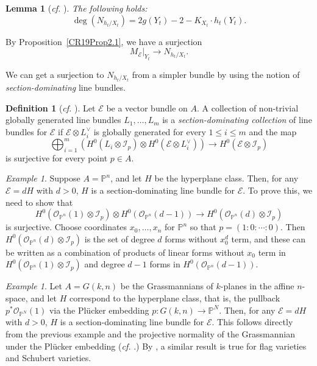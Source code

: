\documentclass[10pt,a4paper]{article}
\numberwithin{equation}{section}
\newtheorem{lemma}[theorem]{Lemma}
\theoremstyle{definition}
\newtheorem{definition}[theorem]{Definition}
\theoremstyle{remark}
\newtheorem{example}[theorem]{Example}
\newcommand{\cI}{\mathcal{I}}
\newcommand{\cO}{\mathcal{O}}
\renewcommand{\P}{\mathbb{P}}
\newcommand{\lra}{\longrightarrow}
\begin{document}
\begin{lemma}[\textit{cf.} {\cite[Lemma 2.2]{CR19}}] \label{deggenus}
The following holds:
\[ \deg \left(N_{h_t/X_t}\right) = 2g(Y_t)-2 - K_{X_t}\cdot h_t(Y_t). \]
\end{lemma}

By Proposition~\ref{CR19Prop2.1}, we have a surjection
\begin{equation}\label{surjection_from_M_E}
    M_{\mathcal{E}}|_{Y_t}\lra N_{h_t/X_t}.
\end{equation}

We can get a surjection to $N_{h_t/X_t}$ from a simpler bundle by using the notion of \textit{section-dominating} line bundles.

\begin{definition}[\textit{cf.} {\cite[Definition 2.3]{CR19}}]\label{definition_section_dominating}
Let $\mathcal{E}$ be a vector bundle on $A$. A collection of non-trivial globally generated line bundles $L_1, \hdots , L_m$ is a \textit{section-dominating collection} of line bundles for $\mathcal{E}$ if $\mathcal{E}\otimes L_i^\vee$ is globally generated for every $1\le i\le m$ and the map
\[ \bigoplus_{i=1}^{m} \left ( H^0(L_i\otimes \cI_p)\otimes H^0\left(\mathcal{E}\otimes L_i^\vee\right) \right )\lra H^0(\mathcal{E}\otimes \cI_p) \]
is surjective for every point $p\in A$.
\end{definition}

\begin{example}
Suppose $A = \P^n$, and let $H$ be the hyperplane class. Then, for any $\mathcal{E} = dH$ with $d>0$, $H$ is a section-dominating line bundle for $\mathcal{E}$. To prove this, we need to show that
\[ H^0\left(\cO_{\P^n}(1)\otimes \cI_p\right)\otimes H^0\left(\cO_{\P^n}(d-1)\right)\lra H^0\left(\cO_{\P^n}(d)\otimes \cI_p\right) \]
is surjective. Choose coordinates $x_0, \hdots , x_n$ for $\P^n$ so that $p=(1:0:\cdots:0)$. Then
$H^0(\cO_{\P^n}(d)\otimes \cI_p)$ is the set of degree $d$ forms without $x_0^d$ term, and these can be written as a combination of products of linear forms without $x_0$ term in $H^0(\cO_{\P^n}(1)\otimes \cI_p)$ and degree $d-1$ forms in $H^0(\cO_{\P^n}(d-1))$.
\end{example}

\begin{example}\label{section-dominating}
Let $A = G(k,n)$ be the Grassmannians of $k$-planes in the affine $n$-space, and let $H$ correspond to the hyperplane class, that is, the pullback $p^*\cO_{\P^N}(1)$ via the Pl\"ucker embedding $p\colon G(k,n)\to \P^N$. Then, for any $\mathcal{E} = dH$ with $d>0$, $H$ is a section-dominating line bundle for $\mathcal{E}$. This follows directly from the previous example and the projective normality of the Grassmannian under the Pl\"ucker embedding (\textit{cf.} \cite{RR85}.) By \cite{RR85}, a similar result is true for flag varieties and Schubert varieties.
\end{example}
\end{document}
